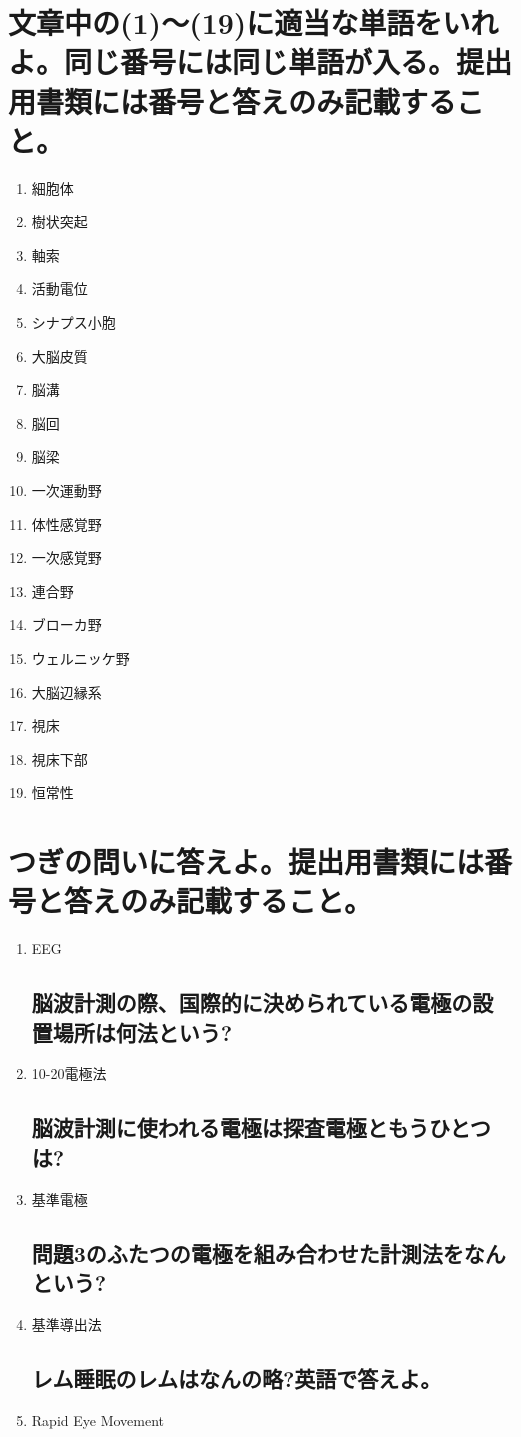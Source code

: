 \documentclass[titlepage,a4paper]{jsarticle}
\begin{document}
\section{文章中の(1)〜(19)に適当な単語をいれよ。同じ番号には同じ単語が入る。提出用書類には番号と答えのみ記載すること。}%
\begin{enumerate}
      \item 細胞体
      \item 樹状突起
      \item 軸索
      \item 活動電位
      \item シナプス小胞
      \item 大脳皮質
      \item 脳溝
      \item 脳回
      \item 脳梁
      \item 一次運動野
      \item 体性感覚野
      \item 一次感覚野
      \item 連合野
      \item ブローカ野
      \item ウェルニッケ野
      \item 大脳辺縁系
      \item 視床
      \item 視床下部
      \item 恒常性
\end{enumerate}
\section{つぎの問いに答えよ。提出用書類には番号と答えのみ記載すること。}%
\begin{enumerate}
      \subsection{脳波のアルファベットの略字は?}
      \item EEG
            \subsection{脳波計測の際、国際的に決められている電極の設置場所は何法という?}
      \item 10-20電極法
            \subsection{脳波計測に使われる電極は探査電極ともうひとつは?}
      \item 基準電極
            \subsection{問題3のふたつの電極を組み合わせた計測法をなんという?}
      \item 基準導出法
            \subsection{レム睡眠のレムはなんの略?英語で答えよ。}
      \item Rapid Eye Movement
\end{enumerate}
\end{document}

